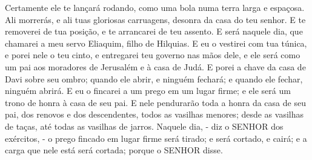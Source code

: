 {{}
Certamente ele te lançará rodando, como uma bola numa terra larga e espaçosa. Ali morrerás, e ali
{} tuas gloriosas carruagens,
{} desonra da casa do teu senhor.
E te removerei de tua posição, e te arrancarei de teu assento.
E será naquele dia, que chamarei a meu servo Eliaquim, filho de Hilquias.
E eu o vestirei com tua túnica, e porei nele o teu cinto, e entregarei teu governo nas mãos dele, e ele será como um pai aos moradores de Jerusalém e à casa de Judá.
E porei a chave da casa de Davi sobre seu ombro; quando ele abrir, e ninguém fechará; e quando ele fechar, ninguém abrirá.
E eu o fincarei
{} a um prego em um lugar firme; e ele será um trono de honra à casa de seu pai.
E nele pendurarão toda a honra da casa de seu pai, dos renovos e dos descendentes, todos as vasilhas menores; desde as vasilhas de taças, até todas as vasilhas de jarros.
Naquele dia, - diz o SENHOR dos exércitos, - o prego fincado em lugar firme será tirado; e será cortado, e cairá; e a carga que nele está será cortada; porque
{} o SENHOR disse.

}
